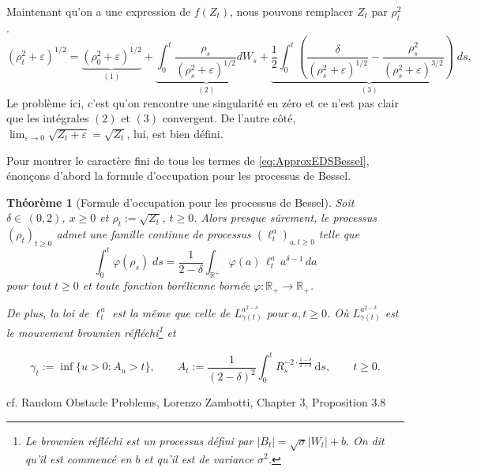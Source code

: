 \documentclass[openany]{book}
\makeatletter
\newcommand{\1}{\mathbbm{1}}
\renewenvironment{proof}[1][\textbf{\textit{Démonstration}}]{%
  \par\pushQED{\qed}%
  \normalfont\topsep6\p@\@plus6\p@\relax
  \trivlist\item[\hskip\labelsep
    #1\@addpunct{.}]\ignorespaces
}{%
  \popQED\endtrivlist\@endpefalse
}
\theoremstyle{thmfont}
\newtheorem{theorem}{Théorème}[chapter]
\theoremstyle{deffont}
\theoremstyle{thmfont}
\theoremstyle{deffont}
\makeatother
\begin{document}
Maintenant qu'on a une expression de $f(Z_t)$, nous pouvons remplacer $Z_t$ par $\rho_t^2$.
\begin{equation}
  (\rho_t^2 + \varepsilon)^{1/2} = \underbrace{(\rho_0^2 + \varepsilon)^{1/2}}_{(1)} + \underbrace{\int_0^t  \dfrac{\rho_s}{(\rho_s^2 + \varepsilon)^{1/2}}dW_s}_{(2)} +  \underbrace{\dfrac{1}{2} \int_0^t \left(\dfrac{\delta}{(\rho_s^2 + \varepsilon)^{1/2}} - \dfrac{\rho_s^2}{(\rho_s^2 + \varepsilon)^{3/2}}\right)\; ds}_{(3)},
  \label{eq:ApproxEDSBessel}
\end{equation}
Le problème ici, c'est qu'on rencontre une singularité en zéro et ce n'est pas clair que les intégrales $(2)$ et $(3)$ convergent. De l'autre côté, $\lim_{\varepsilon \to 0} \sqrt{Z_t + \varepsilon} = \sqrt{Z_t}$, lui, est bien défini.

Pour montrer le caractère fini de tous les termes de \eqref{eq:ApproxEDSBessel}, énonçons d'abord la formule d'occupation pour les processus de Bessel.

\begin{theorem}[Formule d'occupation pour les processus de Bessel]
  \label{thm:occupationBessel}
  Soit $\delta \in \, (0,2)$, $x \geq 0$ et $\rho_t := \sqrt{Z_t}$, $t \geq 0$. Alors presque sûrement, le processus $(\rho_t)_{t \geq 0}$ admet une famille continue de processus $(\ell_t^a)_{a, t \geq 0}$ telle que
\begin{equation}
  \int_0^t \varphi(\rho_s)\; ds = \frac{1}{2 - \delta} \int_{\mathbb{R}^+} \varphi(a)\, \ell_t^a\, a^{\delta - 1}\, da
  \end{equation}
pour tout $t \geq 0$ et toute fonction borélienne bornée $\varphi : \mathbb{R}_+ \rightarrow \mathbb{R}_+$.

De plus, la loi de $\ell_t^a$ est la même que celle de $L_{\gamma(t)}^{a^{2-\delta}}$ pour $a, t \geq 0$. Où $L_{\gamma(t)}^{a^{2-\delta}}$ est le mouvement brownien réfléchi\footnote{Le brownien réfléchi est un processus défini par $|B_t| = \sqrt{\sigma}|W_t| + b.$ On dit qu'il est commencé en $b$ et qu'il est de variance $\sigma^2$.} et

  $$\gamma_t := \inf\{ u > 0 : A_u > t \}, \qquad
A_t := \frac{1}{(2 - \delta)^2} \int_0^t R_s^{-2 \cdot \frac{1 - \delta}{2 - \delta}} \, \mathrm{d}s, \qquad t \geq 0.
$$
\end{theorem}
\begin{proof}cf. Random Obstacle Problems, Lorenzo Zambotti, Chapter 3, Proposition 3.8
\end{proof}
\end{document}
